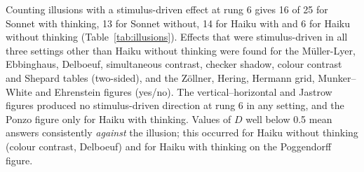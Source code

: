 \documentclass[11pt]{article}
\begin{document}
Counting illusions with a stimulus-driven effect at rung 6 gives 16 of 25 for Sonnet with thinking, 13 for Sonnet
without, 14 for Haiku with and 6 for Haiku without thinking (Table~\ref{tab:illusions}). Effects that were stimulus-driven in all three settings other than Haiku without thinking were found for the Müller-Lyer, Ebbinghaus, Delboeuf, simultaneous contrast, checker shadow, colour contrast
and Shepard tables (two-sided), and the Zöllner, Hering, Hermann grid, Munker--White and Ehrenstein figures (yes/no).
The vertical--horizontal and Jastrow figures produced no stimulus-driven direction at rung 6 in any setting, and the Ponzo figure only for Haiku with thinking. Values of $D$ well below 0.5 mean answers consistently \emph{against} the illusion; this occurred for Haiku without
thinking (colour contrast, Delboeuf) and for Haiku with thinking on the Poggendorff figure.
\end{document}
